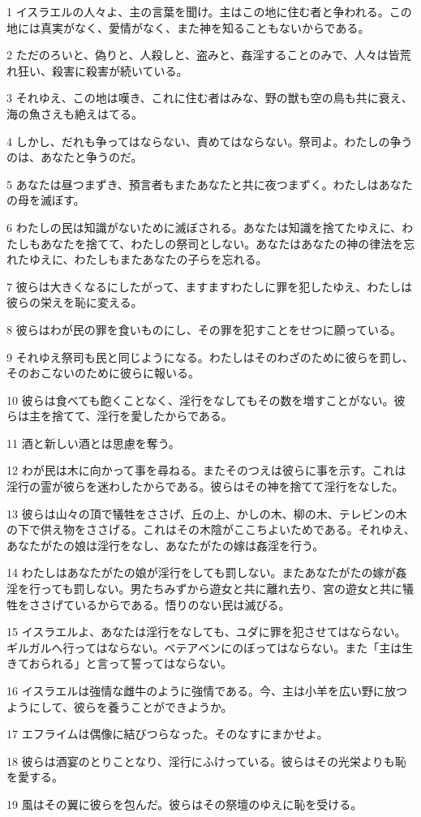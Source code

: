 \par 1 イスラエルの人々よ、主の言葉を聞け。主はこの地に住む者と争われる。この地には真実がなく、愛情がなく、また神を知ることもないからである。
\par 2 ただのろいと、偽りと、人殺しと、盗みと、姦淫することのみで、人々は皆荒れ狂い、殺害に殺害が続いている。
\par 3 それゆえ、この地は嘆き、これに住む者はみな、野の獣も空の鳥も共に衰え、海の魚さえも絶えはてる。
\par 4 しかし、だれも争ってはならない、責めてはならない。祭司よ。わたしの争うのは、あなたと争うのだ。
\par 5 あなたは昼つまずき、預言者もまたあなたと共に夜つまずく。わたしはあなたの母を滅ぼす。
\par 6 わたしの民は知識がないために滅ぼされる。あなたは知識を捨てたゆえに、わたしもあなたを捨てて、わたしの祭司としない。あなたはあなたの神の律法を忘れたゆえに、わたしもまたあなたの子らを忘れる。
\par 7 彼らは大きくなるにしたがって、ますますわたしに罪を犯したゆえ、わたしは彼らの栄えを恥に変える。
\par 8 彼らはわが民の罪を食いものにし、その罪を犯すことをせつに願っている。
\par 9 それゆえ祭司も民と同じようになる。わたしはそのわざのために彼らを罰し、そのおこないのために彼らに報いる。
\par 10 彼らは食べても飽くことなく、淫行をなしてもその数を増すことがない。彼らは主を捨てて、淫行を愛したからである。
\par 11 酒と新しい酒とは思慮を奪う。
\par 12 わが民は木に向かって事を尋ねる。またそのつえは彼らに事を示す。これは淫行の霊が彼らを迷わしたからである。彼らはその神を捨てて淫行をなした。
\par 13 彼らは山々の頂で犠牲をささげ、丘の上、かしの木、柳の木、テレビンの木の下で供え物をささげる。これはその木陰がここちよいためである。それゆえ、あなたがたの娘は淫行をなし、あなたがたの嫁は姦淫を行う。
\par 14 わたしはあなたがたの娘が淫行をしても罰しない。またあなたがたの嫁が姦淫を行っても罰しない。男たちみずから遊女と共に離れ去り、宮の遊女と共に犠牲をささげているからである。悟りのない民は滅びる。
\par 15 イスラエルよ、あなたは淫行をなしても、ユダに罪を犯させてはならない。ギルガルへ行ってはならない。ベテアベンにのぼってはならない。また「主は生きておられる」と言って誓ってはならない。
\par 16 イスラエルは強情な雌牛のように強情である。今、主は小羊を広い野に放つようにして、彼らを養うことができようか。
\par 17 エフライムは偶像に結びつらなった。そのなすにまかせよ。
\par 18 彼らは酒宴のとりことなり、淫行にふけっている。彼らはその光栄よりも恥を愛する。
\par 19 風はその翼に彼らを包んだ。彼らはその祭壇のゆえに恥を受ける。

